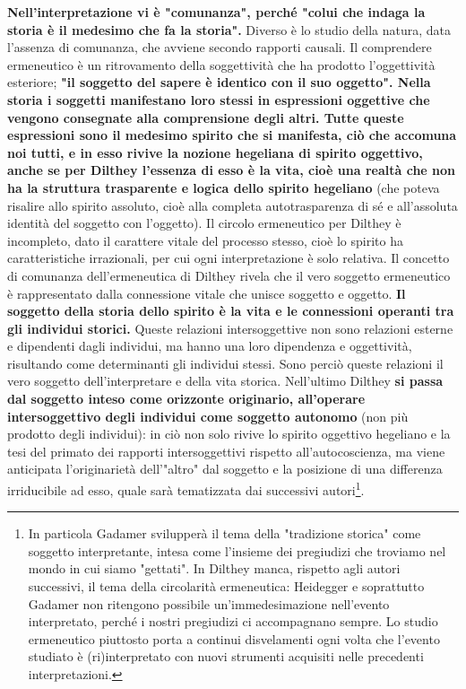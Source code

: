 \textbf{Nell'interpretazione vi è "comunanza", perché "colui che
indaga la storia è il medesimo che fa la storia".}
Diverso è lo studio della natura, data l'assenza
di comunanza, che avviene secondo rapporti causali.
Il comprendere ermeneutico è un ritrovamento della soggettività che ha prodotto l'oggettività
esteriore; \textbf{"il soggetto del sapere è identico con
il suo oggetto".
Nella storia i soggetti manifestano loro stessi in
espressioni oggettive che vengono consegnate alla
comprensione degli altri. Tutte queste espressioni
sono il medesimo spirito che si manifesta, ciò
che accomuna noi tutti, e in esso rivive la nozione
hegeliana di spirito oggettivo, anche se per
Dilthey l'essenza di esso è la vita, cioè una
realtà che non ha la struttura trasparente e logica
dello spirito hegeliano} (che poteva risalire allo spirito
assoluto, cioè alla completa autotrasparenza
di sé e all'assoluta identità del soggetto con
l'oggetto).
Il circolo ermeneutico per Dilthey è incompleto,
dato il carattere vitale del processo stesso, cioè
lo spirito ha caratteristiche irrazionali, per cui ogni
interpretazione è solo relativa.
Il concetto di comunanza dell'ermeneutica di Dilthey
rivela che il vero soggetto ermeneutico è rappresentato
dalla connessione vitale che unisce soggetto e oggetto.
\textbf{Il soggetto della storia dello spirito è
la vita e le connessioni operanti tra gli individui
storici.} Queste relazioni intersoggettive non sono
relazioni esterne e dipendenti dagli individui, ma
hanno una loro dipendenza e oggettività,  risultando
come determinanti gli individui stessi. Sono perciò
queste relazioni il vero soggetto dell'interpretare
e della vita storica. Nell'ultimo Dilthey \textbf{si
passa dal soggetto inteso come orizzonte originario,
all'operare intersoggettivo degli individui
come soggetto autonomo} (non più prodotto degli
individui): in ciò non solo rivive lo spirito
oggettivo hegeliano e la tesi del primato
dei rapporti intersoggettivi rispetto all'autocoscienza, ma viene anticipata
l'originarietà dell'"altro" dal soggetto
e la posizione di una differenza irriducibile
ad esso, quale sarà tematizzata dai successivi
autori\footnote{In particola Gadamer svilupperà il tema della "tradizione storica" come soggetto interpretante, intesa come l'insieme dei pregiudizi che troviamo nel mondo in cui siamo "gettati". In Dilthey manca, rispetto agli autori successivi, il tema della circolarità ermeneutica: Heidegger e soprattutto Gadamer non ritengono possibile un'immedesimazione nell'evento interpretato, perché i nostri pregiudizi ci accompagnano sempre. Lo studio ermeneutico piuttosto porta a continui disvelamenti ogni volta che l'evento studiato è (ri)interpretato con nuovi strumenti acquisiti nelle precedenti interpretazioni.}.

